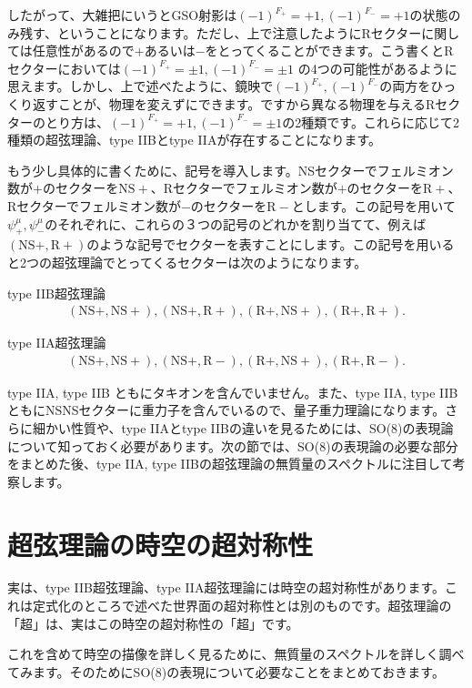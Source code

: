 \documentclass[report,paper=a4, fontsize=12pt, line_length=16cm, number_of_lines=33,dvipdfmx]{jlreq}
\newenvironment{important}{\begin{tcolorbox}[
  colback = white,
  colframe = red!35,
  boxrule = 2mm,
  fonttitle = \bfseries,
  after = \noindent] }{\end{tcolorbox}}
\numberwithin{equation}{chapter}
\numberwithin{equation}{section}
\newcommand{\NSp}{\mathrm{NS}+}
\newcommand{\Rp}{\mathrm{R}+}
\newcommand{\Rm}{\mathrm{R}-}
\begin{document}
したがって、大雑把にいうとGSO射影は$(-1)^{F_{+}}=+1,(-1)^{F_{-}}=+1$の状態のみ残す、ということになります。ただし、上で注意したようにRセクターに関しては任意性があるので$+$あるいは$-$をとってくることができます。こう書くとRセクターにおいては$(-1)^{F_{+}}=\pm 1,(-1)^{F_{-}}=\pm 1$ の4つの可能性があるように思えます。しかし、上で述べたように、鏡映で$(-1)^{F_{+}},(-1)^{F_{-}}$の両方をひっくり返すことが、物理を変えずにできます。ですから異なる物理を与えるRセクターのとり方は、$(-1)^{F_{+}}=+1,(-1)^{F_{-}}=\pm 1$の2種類です。これらに応じて2種類の超弦理論、type IIBとtype IIAが存在することになります。

もう少し具体的に書くために、記号を導入します。NSセクターでフェルミオン数が$+$のセクターを$\NSp$、Rセクターでフェルミオン数が$+$のセクターを$\Rp$、Rセクターでフェルミオン数が$-$のセクターを$\Rm$とします。この記号を用いて$\psi^{\mu}_{+},\psi^{\mu}_{-}$のそれぞれに、これらの３つの記号のどれかを割り当てて、例えば$(\NSp,\Rp)$のような記号でセクターを表すことにします。この記号を用いると2つの超弦理論でとってくるセクターは次のようになります。
\begin{important}
  type IIB超弦理論
  \begin{align}
    (\NSp,\NSp),
    (\NSp,\Rp),
    (\Rp,\NSp),
    (\Rp,\Rp).
  \end{align}
\end{important}
\begin{important}
  type IIA超弦理論
  \begin{align}
    (\NSp,\NSp),
    (\NSp,\Rm),
    (\Rp,\NSp),
    (\Rp,\Rm).
  \end{align}
\end{important}

type IIA, type IIB ともにタキオンを含んでいません。また、type IIA, type IIB ともにNSNSセクターに重力子を含んでいるので、量子重力理論になります。さらに細かい性質や、type IIAとtype IIBの違いを見るためには、SO(8)の表現論について知っておく必要があります。次の節では、SO(8)の表現論の必要な部分をまとめた後、type IIA, type IIBの超弦理論の無質量のスペクトルに注目して考察します。

\section{超弦理論の時空の超対称性}
実は、type IIB超弦理論、type IIA超弦理論には時空の超対称性があります。これは定式化のところで述べた世界面の超対称性とは別のものです。超弦理論の「超」は、実はこの時空の超対称性の「超」です。

これを含めて時空の描像を詳しく見るために、無質量のスペクトルを詳しく調べてみます。そのためにSO(8)の表現について必要なことをまとめておきます。
\end{document}
